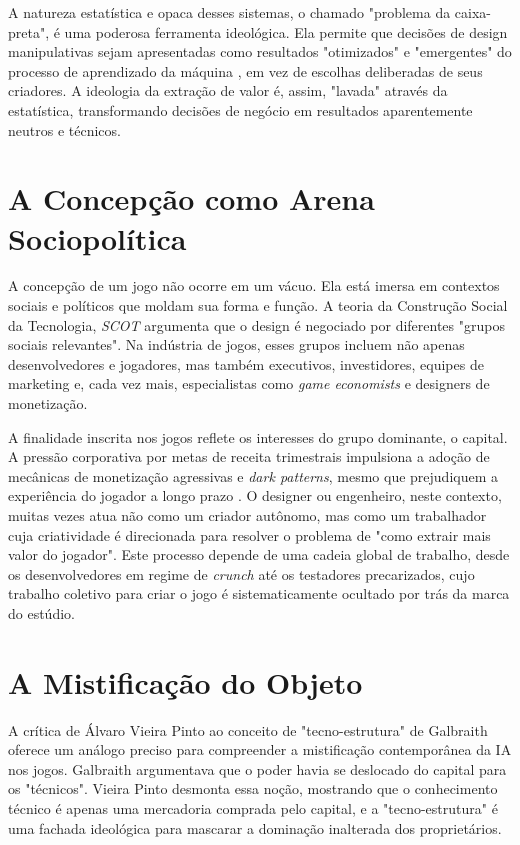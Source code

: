A natureza estatística e opaca desses sistemas, o chamado "problema da caixa-preta", é uma poderosa ferramenta ideológica. Ela 
permite que decisões de design manipulativas sejam apresentadas como resultados "otimizados" e "emergentes" do processo de 
aprendizado da máquina \cite{Bender2021}, em vez de escolhas deliberadas de seus criadores. A ideologia da extração de valor é, assim, "lavada" através 
da estatística, transformando decisões de negócio em resultados aparentemente neutros e técnicos.

\section{A Concepção como Arena Sociopolítica}\label{sec:concepcao_arena_sociopolitica}

A concepção de um jogo não ocorre em um vácuo. Ela está imersa em contextos sociais e políticos que moldam sua forma e função. A 
teoria da Construção Social da Tecnologia, \textit{SCOT} \cite{BijkerPinch1989} argumenta que o design é negociado por diferentes "grupos sociais relevantes". 
Na indústria de jogos, esses grupos incluem não apenas desenvolvedores e jogadores, mas também executivos, investidores, equipes de 
marketing e, cada vez mais, especialistas como \textit{game economists} e designers de monetização.

A finalidade inscrita nos jogos reflete os interesses do grupo dominante, o capital. A pressão corporativa por metas de receita 
trimestrais impulsiona a adoção de mecânicas de monetização agressivas e \textit{dark patterns}, mesmo que prejudiquem a experiência 
do jogador a longo prazo \cite{PetrovskayaZendle2022}. O designer ou engenheiro, neste contexto, muitas vezes atua não como um criador autônomo, mas como um 
trabalhador cuja criatividade é direcionada para resolver o problema de "como extrair mais valor do jogador". Este processo depende 
de uma cadeia global de trabalho, desde os desenvolvedores em regime de \textit{crunch} até os testadores precarizados, cujo trabalho 
coletivo para criar o jogo é sistematicamente ocultado por trás da marca do estúdio.

\section{A Mistificação do Objeto}\label{sec:mistificacao_obj}

A crítica de Álvaro Vieira Pinto ao conceito de "tecno-estrutura" de Galbraith \cite{VieiraPinto2005,Galbraith1967} oferece um análogo preciso para compreender a 
mistificação contemporânea da IA nos jogos. Galbraith argumentava que o poder havia se deslocado do capital para os "técnicos". 
Vieira Pinto desmonta essa noção, mostrando que o conhecimento técnico é apenas uma mercadoria comprada pelo capital, e a 
"tecno-estrutura" é uma fachada ideológica para mascarar a dominação inalterada dos proprietários.

